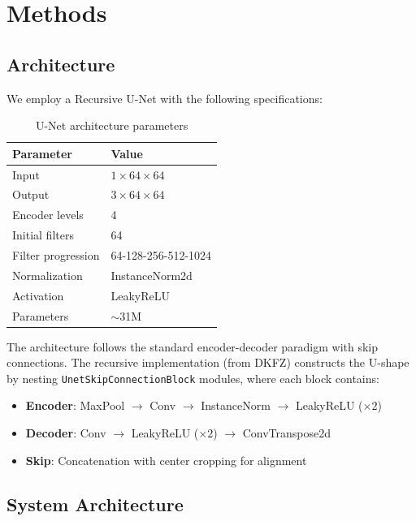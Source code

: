 \documentclass[12pt,a4paper,twocolumn]{article}
\begin{document}
\section{Methods}

\subsection{Architecture}

We employ a Recursive U-Net with the following specifications:

\begin{table}[H]
\centering
\small
\begin{tabular}{ll}
\toprule
\textbf{Parameter} & \textbf{Value} \\
\midrule
Input & $1 \times 64 \times 64$ \\
Output & $3 \times 64 \times 64$ \\
Encoder levels & 4 \\
Initial filters & 64 \\
Filter progression & 64-128-256-512-1024 \\
Normalization & InstanceNorm2d \\
Activation & LeakyReLU \\
Parameters & $\sim$31M \\
\bottomrule
\end{tabular}
\caption{U-Net architecture parameters}
\end{table}

The architecture follows the standard encoder-decoder paradigm with skip connections. The recursive implementation (from DKFZ) constructs the U-shape by nesting \texttt{UnetSkipConnectionBlock} modules, where each block contains:
\begin{itemize}[nosep]
    \item \textbf{Encoder}: MaxPool $\to$ Conv $\to$ InstanceNorm $\to$ LeakyReLU ($\times 2$)
    \item \textbf{Decoder}: Conv $\to$ LeakyReLU ($\times 2$) $\to$ ConvTranspose2d
    \item \textbf{Skip}: Concatenation with center cropping for alignment
\end{itemize}

\subsection{System Architecture}
\end{document}
